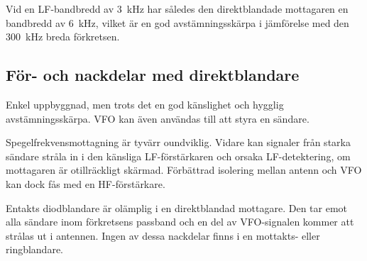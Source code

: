 Vid en LF-bandbredd av 3~kHz har således den direktblandade mottagaren
en bandbredd av 6~kHz, vilket är en god avstämningsskärpa i jämförelse
med den 300~kHz breda förkretsen.

\subsection{För- och nackdelar med direktblandare}

Enkel uppbyggnad, men trots det en god känslighet och hygglig
avstämningsskärpa. VFO kan även användas till att styra en sändare.

Spegelfrekvensmottagning är tyvärr oundviklig. Vidare kan signaler
från starka sändare stråla in i den känsliga LF-förstärkaren och
orsaka LF-detektering, om mottagaren är otillräckligt
skärmad. Förbättrad isolering mellan antenn och VFO kan dock fås med
en HF-förstärkare.

Entakts diodblandare är olämplig i en direktblandad mottagare. Den tar
emot alla sändare inom förkretsens passband och en del av VFO-signalen
kommer att strålas ut i antennen. Ingen av dessa nackdelar finns i en
mottakts- eller ringblandare.
